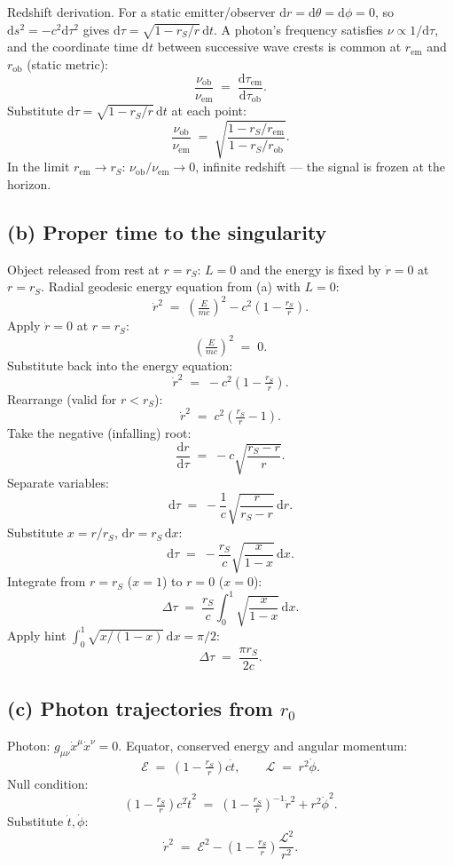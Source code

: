 \documentclass[11pt]{article}
\newcommand{\de}{\mathrm{d}}
\begin{document}
Redshift derivation. For a static emitter/observer $\de r=\de\theta=\de\phi=0$, so $\de s^2=-c^2\de\tau^2$ gives $\de\tau=\sqrt{1-r_S/r}\,\de t$. A photon's frequency satisfies $\nu\propto 1/\de\tau$, and the coordinate time $\de t$ between successive wave crests is common at $r_\text{em}$ and $r_\text{ob}$ (static metric):
\[
\frac{\nu_\text{ob}}{\nu_\text{em}} \;=\; \frac{\de\tau_\text{em}}{\de\tau_\text{ob}}.
\]
Substitute $\de\tau=\sqrt{1-r_S/r}\,\de t$ at each point:
\begin{equation}
\boxed{\;\frac{\nu_\text{ob}}{\nu_\text{em}} \;=\; \sqrt{\frac{1-r_S/r_\text{em}}{1-r_S/r_\text{ob}}}.\;}
\label{eq:redshift}
\end{equation}
In the limit $r_\text{em}\to r_S$: $\nu_\text{ob}/\nu_\text{em}\to 0$, infinite redshift --- the signal is frozen at the horizon.

\subsection*{(b) Proper time to the singularity}

Object released from rest at $r=r_S$: $L=0$ and the energy is fixed by $\dot r=0$ at $r=r_S$. Radial geodesic energy equation from (a) with $L=0$:
\[
\dot r^2 \;=\; \left(\tfrac{E}{mc}\right)^2 - c^2\!\left(1-\tfrac{r_S}{r}\right).
\]
Apply $\dot r=0$ at $r=r_S$:
\[
\left(\tfrac{E}{mc}\right)^2 \;=\; 0.
\]
Substitute back into the energy equation:
\[
\dot r^2 \;=\; -c^2\!\left(1-\tfrac{r_S}{r}\right).
\]
Rearrange (valid for $r<r_S$):
\[
\dot r^2 \;=\; c^2\!\left(\tfrac{r_S}{r}-1\right).
\]
Take the negative (infalling) root:
\[
\frac{\de r}{\de\tau} \;=\; -c\sqrt{\frac{r_S-r}{r}}.
\]
Separate variables:
\[
\de\tau \;=\; -\frac{1}{c}\sqrt{\frac{r}{r_S-r}}\,\de r.
\]
Substitute $x=r/r_S$, $\de r=r_S\,\de x$:
\[
\de\tau \;=\; -\frac{r_S}{c}\sqrt{\frac{x}{1-x}}\,\de x.
\]
Integrate from $r=r_S$ ($x=1$) to $r=0$ ($x=0$):
\[
\Delta\tau \;=\; \frac{r_S}{c}\!\int_0^1\!\sqrt{\frac{x}{1-x}}\,\de x.
\]
Apply hint $\int_0^1\sqrt{x/(1-x)}\,\de x=\pi/2$:
\begin{equation}
\boxed{\;\Delta\tau \;=\; \frac{\pi r_S}{2c}.\;}
\label{eq:tauin}
\end{equation}

\subsection*{(c) Photon trajectories from $r_0$}

Photon: $g_{\mu\nu}\dot x^\mu\dot x^\nu=0$. Equator, conserved energy and angular momentum:
\[
\mathcal E \;=\; \left(1-\tfrac{r_S}{r}\right)c\dot t,\qquad \mathcal L \;=\; r^2\dot\phi.
\]
Null condition:
\[
\left(1-\tfrac{r_S}{r}\right)c^2\dot t^2 \;=\; \left(1-\tfrac{r_S}{r}\right)^{-1}\dot r^2 + r^2\dot\phi^2.
\]
Substitute $\dot t,\dot\phi$:
\begin{equation}
\dot r^2 \;=\; \mathcal E^2 - \left(1-\tfrac{r_S}{r}\right)\frac{\mathcal L^2}{r^2}.
\label{eq:rphoton}
\end{equation}
\end{document}
